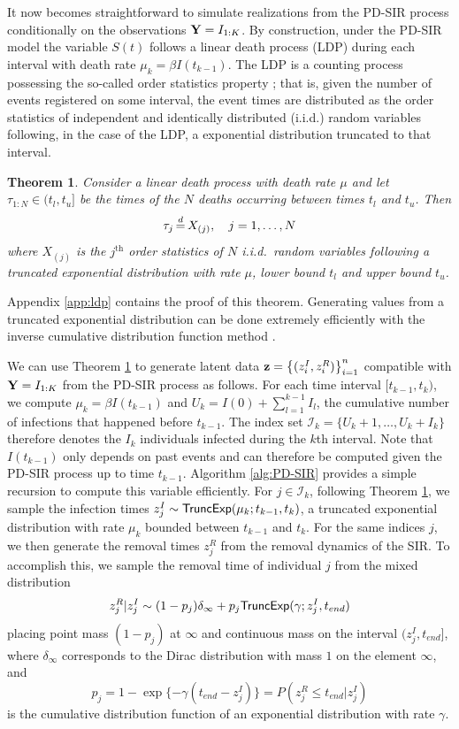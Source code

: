 \documentclass[11pt]{article}
\newtheorem{theorem}{Theorem}[section]
\begin{document}
	It now becomes straightforward to simulate realizations from the PD-SIR process conditionally on the observations $\mathbf{Y} = I_{1:K}$. By construction, under the PD-SIR model the variable $S(t)$ follows a linear death process (LDP) during each interval with death rate $\mu_k = \beta I(t_{k-1})$. 
	The LDP is a counting process possessing the so-called order statistics property \cite{Neuts.1971}; that is, given the number of events registered on some interval, the event times are distributed as the order statistics of independent and identically distributed (i.i.d.) random variables following, in the case of the LDP, a exponential distribution truncated to that interval.
	\begin{theorem}
		\label{theo:ldp}
		Consider a linear death process with death rate $\mu$ and let $\tau_{1:N} \in (t_l, t_u]$ be the times of the $N$ deaths occurring between times $t_l$ and $t_u$. Then 
		$$\tau_j \,{\buildrel d \over =}\, X_{(j)}, \quad j = 1, \dots, N$$
		where $X_{(j)}$ is the $j^{\text{th}}$ order statistics of $N$ i.i.d.\ random variables following a truncated exponential distribution with rate $\mu$, lower bound $t_l$ and upper bound $t_u$.
	\end{theorem}
	Appendix \ref{app:ldp} contains the proof of this theorem. Generating values from a truncated exponential distribution can be done extremely efficiently with the inverse cumulative distribution function method \cite{Devroye.2006}. 
	
	We can use Theorem \ref{theo:ldp} to generate latent data  $\mathbf{z} = \left\lbrace (z^I_i, z^R_i)\right\rbrace_{i=1}^{n}$ compatible with $\mathbf{Y} = I_{1:K}$ from the PD-SIR process as follows. For each time interval $[t_{k-1}, t_k)$, we compute $\mu_k = \beta I(t_{k-1})$ and $U_k = I(0) + \sum_{l=1}^{k-1} I_l$, the cumulative number of infections that happened before $t_{k-1}$. The index set $\mathcal{I}_k = \{U_k + 1, \dots, U_k + I_k\}$ therefore denotes the $I_k$ individuals infected during the $k$th interval. Note that $I(t_{k-1})$ only depends on past events and can therefore be computed given the PD-SIR process up to time $t_{k-1}$. Algorithm \ref{alg:PD-SIR} provides a simple recursion to compute this variable efficiently. For $j \in \mathcal{I}_k$, following Theorem \ref{theo:ldp}, we sample the infection times $z^I_j \sim \textsf{TruncExp}(\mu_k; t_{k-1}, t_k)$, a truncated exponential distribution with rate $\mu_k$ bounded between $t_{k-1}$ and $t_k$. For the same indices $j$, we then generate the removal times $z^R_j$ from the removal dynamics of the SIR. To accomplish this, we sample the removal time of individual $j$ from the mixed distribution
	$$z^R_j|z^I_j \sim (1 - p_j) \delta_{\infty} + p_j \textsf{TruncExp}(\gamma; z^I_j, t_{end})$$
	placing point mass $(1 - p_j)$ at $\infty$ and continuous mass on the interval $(z^I_j, t_{end}]$,
	where $\delta_{\infty}$ corresponds to the Dirac distribution with mass $1$ on the element $\infty$, and
	$$p_j = 1 - \exp\{-\gamma (t_{end} - z^I_j)\} = P(z^R_j \le t_{end} | z^I_j)$$
	is the cumulative distribution function of an exponential distribution with rate $\gamma$. %
	
\end{document}
